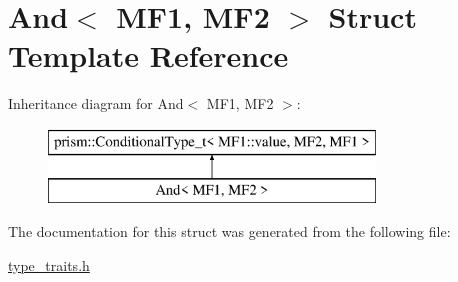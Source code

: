 \hypertarget{struct_and_3_01_m_f1_00_01_m_f2_01_4}{}\section{And$<$ M\+F1, M\+F2 $>$ Struct Template Reference}
\label{struct_and_3_01_m_f1_00_01_m_f2_01_4}
Inheritance diagram for And$<$ M\+F1, M\+F2 $>$\+:\begin{figure}[H]
\begin{center}
\leavevmode
\includegraphics[height=2.000000cm]{struct_and_3_01_m_f1_00_01_m_f2_01_4}
\end{center}
\end{figure}


The documentation for this struct was generated from the following file\+:\begin{DoxyCompactItemize}
\item 
\hyperlink{type__traits_8h}{type\+\_\+traits.\+h}\end{DoxyCompactItemize}
